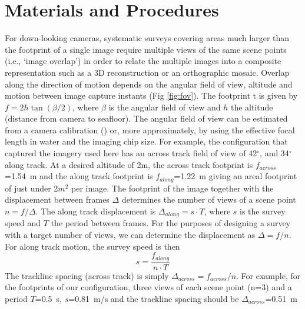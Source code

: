 \section{Materials and Procedures}
\label{sec:MandP}


For down-looking cameras, systematic surveys covering areas much larger than the footprint of a single image require multiple views of the same scene points (i.e., `image overlap') in order to relate the multiple images into a composite representation such as a 3D reconstruction or an orthographic mosaic. Overlap along the direction of motion depends on the angular field of view, altitude and motion between image capture instants (Fig \ref{fig:fov}). The footprint t is given by $f = 2 h \tan(\beta/2)$, where $\beta$ is the angular field of view and $h$ the altitude (distance from camera to seafloor). The angular field of view can be estimated from a camera calibration (\cite{bouguet2004camera}) or, more approximately, by using the effective focal length in water and the imaging chip size. For example, the configuration that captured the imagery used here has an across track field of view of 42$^\circ$, and 34$^\circ$ along track. At a desired altitude of 2m, the across track footprint is $f_{across}$=1.54~m and the along track footprint is $f_{along}$=1.22~m giving an areal footprint of just under 2$m^2$ per image. 
The footprint of the image together with the displacement between frames $\Delta$ determines the number of views of a scene point $n = f /\Delta$. The along track displacement is $\Delta_{along} = s \cdot T$, where $s$ is the survey speed and $T$ the period between frames. 
For the purposes of designing a survey with a target number of views, we can determine the displacement as $\Delta = f/n$. For along track motion, the survey speed is then
\begin{equation}
s = \frac{f_{along}}{n \cdot T}
\end{equation}
The trackline spacing (across track) is simply $\Delta_{across} = f_{across}/n$.
For example, for the footprints of our configuration, three views of each scene point (n=3) and a period $T$=0.5~s, $s$=0.81~m/s and the trackline spacing should be $\Delta_{across}$=0.51~m


